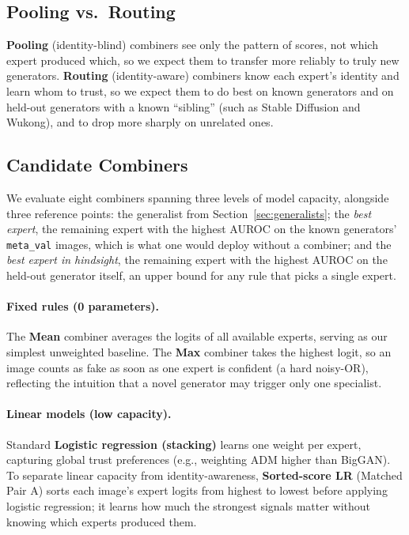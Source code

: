 \documentclass[10pt,a4paper]{article}
\begin{document}
\subsection{Pooling vs.\ Routing}

\textbf{Pooling} (identity-blind) combiners see only the pattern of scores, not which expert produced which, so we expect them to transfer more reliably to truly new generators. \textbf{Routing} (identity-aware) combiners know each expert's identity and learn whom to trust, so we expect them to do best on known generators and on held-out generators with a known ``sibling'' (such as Stable Diffusion and Wukong), and to drop more sharply on unrelated ones.

\subsection{Candidate Combiners}

We evaluate eight combiners spanning three levels of model capacity, alongside three reference points: the generalist from Section~\ref{sec:generalists}; the \emph{best expert}, the remaining expert with the highest AUROC on the known generators' \texttt{meta\_val} images, which is what one would deploy without a combiner; and the \emph{best expert in hindsight}, the remaining expert with the highest AUROC on the held-out generator itself, an upper bound for any rule that picks a single expert.

\paragraph{Fixed rules (0 parameters).}
The \textbf{Mean} combiner averages the logits of all available experts, serving as our simplest unweighted baseline. The \textbf{Max} combiner takes the highest logit, so an image counts as fake as soon as one expert is confident (a hard noisy-OR), reflecting the intuition that a novel generator may trigger only one specialist.

\paragraph{Linear models (low capacity).}
Standard \textbf{Logistic regression (stacking)} learns one weight per expert, capturing global trust preferences (e.g., weighting ADM higher than BigGAN). To separate linear capacity from identity-awareness, \textbf{Sorted-score LR} (Matched Pair A) sorts each image's expert logits from highest to lowest before applying logistic regression; it learns how much the strongest signals matter without knowing which experts produced them.
\end{document}
